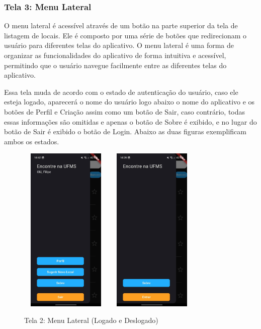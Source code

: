     \FloatBarrier

\subsubsection{Tela 3: Menu Lateral}

    O menu lateral é acessível através de um botão na parte superior da tela de listagem de locais. Ele é composto por uma série de botões que redirecionam o usuário para diferentes telas do aplicativo. O menu lateral é uma forma de organizar as funcionalidades do aplicativo de forma intuitiva e acessível, permitindo que o usuário navegue facilmente entre as diferentes telas do aplicativo.

    Essa tela muda de acordo com o estado de autenticação do usuário, caso ele esteja logado, aparecerá o nome do usuário logo abaixo o nome do aplicativo e os botões de Perfil e Criação assim como um botão de Sair, caso contrário, todas essas informações são omitidas e apenas o botão de Sobre é exibido, e no lugar do botão de Sair é exibido o botão de Login. Abaixo as duas figuras exemplificam ambos os estados.

    \begin{figure}[h]
        \centering
        \includegraphics[width=44mm,height=80mm]{imagens/menu-lateral-logado.jpg}
        \hspace{10mm}
        \includegraphics[width=44mm,height=80mm]{imagens/menu-lateral-logout.jpg}
        \caption{\scriptsize Tela 2: Menu Lateral (Logado e Deslogado)}
        \footnotesize  {}
        \label{fig:tela2-logado}
    \end{figure}

